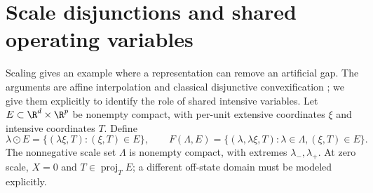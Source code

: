\section{Scale disjunctions and shared operating variables}\label{app:scaling}
Scaling gives an example where a representation can remove an artificial
gap. The arguments are affine interpolation and classical disjunctive
convexification \citep[Section 2, Theorem 2.1]{Balas1998}; we give them
explicitly to identify the role of shared intensive variables.
Let $E\subset\R^d\times\R^p$ be nonempty compact, with per-unit extensive
coordinates $\xi$ and intensive coordinates $T$. Define
\[
 \lambda\odot E=\{(\lambda\xi,T):(\xi,T)\in E\},\qquad
 F(\Lambda,E)=\{(\lambda,\lambda\xi,T):\lambda\in\Lambda,(\xi,T)\in E\}.
\]
The nonnegative scale set $\Lambda$ is nonempty compact, with extremes
$\lambda_-,\lambda_+$. At zero scale, $X=0$ and $T\in\operatorname{proj}_T E$;
a different off-state domain must be modeled explicitly.

